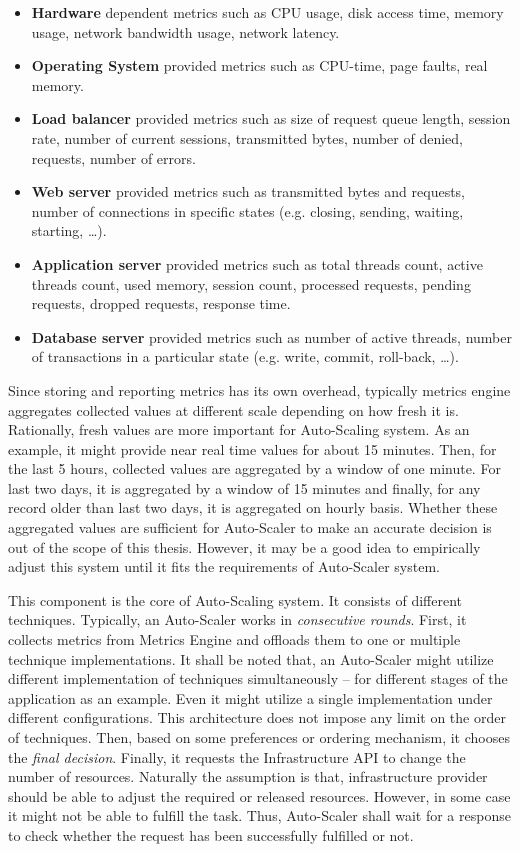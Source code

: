 \begin{description}[leftmargin=0pt]
    \begin{itemize}
        \item \textbf{Hardware} dependent metrics such as CPU usage, disk access time, memory usage, network bandwidth usage, network latency.
        \item \textbf{Operating System} provided metrics such as CPU-time, page faults, real memory.
        \item \textbf{Load balancer} provided metrics such as size of request queue length, session rate, number of current sessions, transmitted bytes, number of denied, requests, number of errors.
        \item \textbf{Web server} provided metrics such as transmitted bytes and requests, number of connections in specific states (e.g. closing, sending, waiting, starting, \dots).
        \item \textbf{Application server} provided metrics such as total threads count, active threads count, used memory, session count, processed requests, pending requests, dropped requests, response time.
        \item \textbf{Database server} provided metrics such as number of active threads, number of transactions in a particular state (e.g. write, commit, roll-back, \dots).
    \end{itemize}
    Since storing and reporting metrics has its own overhead, typically metrics engine aggregates collected values at different scale depending on how fresh it is. Rationally, fresh values are more important for Auto-Scaling system. As an example, it might provide near real time values for about 15 minutes. Then, for the last 5 hours, collected values are aggregated by a window of one minute. For last two days, it is aggregated by a window of 15 minutes and finally, for any record older than last two days, it is aggregated on hourly basis. Whether these aggregated values are sufficient for Auto-Scaler to make an accurate decision is out of the scope of this thesis. However, it may be a good idea to empirically adjust this system until it fits the requirements of Auto-Scaler system.
    \item[Auto-Scaler] This component is the core of Auto-Scaling system. It consists of different techniques. Typically, an Auto-Scaler works in \emph{consecutive rounds}. First, it collects metrics from Metrics Engine and offloads them to one or multiple technique implementations. It shall be noted that, an Auto-Scaler might utilize different implementation of techniques simultaneously -- for different stages of the application as an example. Even it might utilize a single implementation under different configurations. This architecture does not impose any limit on the order of techniques. Then, based on some preferences or ordering mechanism, it chooses the \emph{final decision}. Finally, it requests the Infrastructure API to change the number of resources. Naturally the assumption is that, infrastructure provider should be able to adjust the required or released resources. However, in some case it might not be able to fulfill the task. Thus, Auto-Scaler shall wait for a response to check whether the request has been successfully fulfilled or not. 
\end{description}
